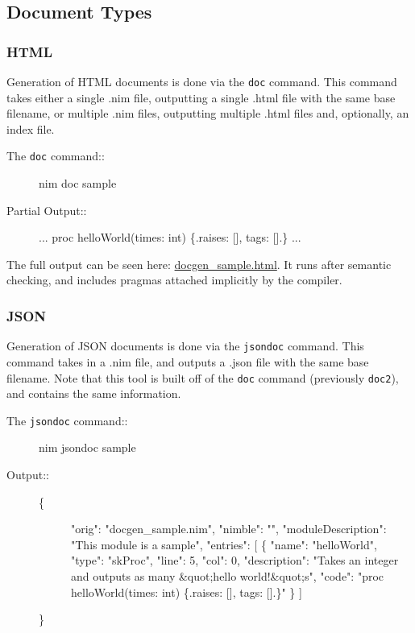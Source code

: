 \hypertarget{document-types}{%
\subsection{Document Types}\label{document-types}}

\hypertarget{html}{%
\subsubsection{HTML}\label{html}}

Generation of HTML documents is done via the \texttt{doc} command. This
command takes either a single .nim file, outputting a single .html file
with the same base filename, or multiple .nim files, outputting multiple
.html files and, optionally, an index file.

\begin{description}
\item[The \texttt{doc} command::]
nim doc sample
\item[Partial Output::]
... proc helloWorld(times: int) \{.raises: {[}{]}, tags: {[}{]}.\} ...
\end{description}

The full output can be seen here: \url{docgen_sample.html}. It runs
after semantic checking, and includes pragmas attached implicitly by the
compiler.

\hypertarget{json}{%
\subsubsection{JSON}\label{json}}

Generation of JSON documents is done via the \texttt{jsondoc} command.
This command takes in a .nim file, and outputs a .json file with the
same base filename. Note that this tool is built off of the \texttt{doc}
command (previously \texttt{doc2}), and contains the same information.

\begin{description}
\item[The \texttt{jsondoc} command::]
nim jsondoc sample
\item[Output::]
\begin{description}
\item[\{]
"orig": "docgen\_sample.nim", "nimble": "", "moduleDescription": "This
module is a sample", "entries": {[} \{ "name": "helloWorld", "type":
"skProc", "line": 5, "col": 0, "description": "Takes an integer and
outputs as many \&quot;hello world!\&quot;s", "code": "proc
helloWorld(times: int) \{.raises: {[}{]}, tags: {[}{]}.\}" \} {]}
\end{description}

\}
\end{description}

